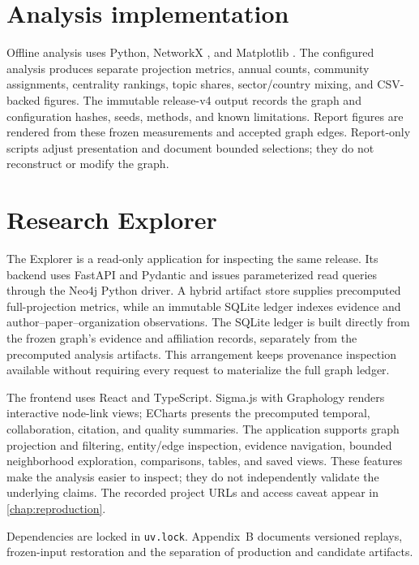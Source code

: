 \section{Analysis implementation}

Offline analysis uses Python, NetworkX \citep{networkxDocs}, and Matplotlib
\citep{matplotlibDocs}. The configured analysis
produces separate projection metrics, annual counts, community assignments,
centrality rankings, topic shares, sector/country mixing, and CSV-backed figures.
The immutable release-v4 output records the graph and configuration hashes,
seeds, methods, and known limitations. Report figures are rendered from these frozen
measurements and accepted graph edges. Report-only scripts adjust presentation
and document bounded selections; they do not reconstruct or modify the graph.

\section{Research Explorer}

The Explorer is a read-only application for inspecting the same release. Its
backend uses FastAPI and Pydantic and issues parameterized read queries through
the Neo4j Python driver. A hybrid artifact store supplies precomputed
full-projection metrics, while an immutable SQLite ledger indexes evidence and
author--paper--organization observations. The SQLite ledger is built directly
from the frozen graph's evidence and affiliation records, separately from the
precomputed analysis artifacts. This arrangement keeps provenance
inspection available without requiring every request to materialize the full
graph ledger.

The frontend uses React and TypeScript. Sigma.js with Graphology renders
interactive node-link views; ECharts presents the precomputed temporal,
collaboration, citation, and quality summaries. The application supports graph
projection and filtering, entity/edge inspection, evidence navigation,
bounded neighborhood exploration, comparisons, tables, and saved views. These
features make the analysis easier to inspect; they do not independently validate
the underlying claims. The recorded project URLs and access caveat appear in
\cref{chap:reproduction}.

Dependencies are locked in \texttt{uv.lock}. Appendix~B documents versioned
replays, frozen-input restoration and the separation of production and candidate
artifacts.
